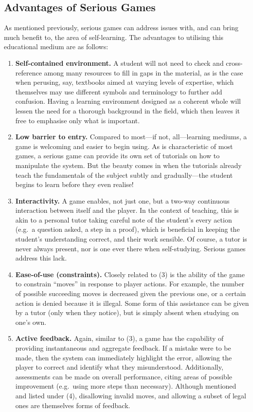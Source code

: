 \documentclass[a4paper]{article}
\begin{document}
\subsection{Advantages of Serious Games}
As mentioned previously, serious games can address issues with, and can bring much benefit to, the area of self-learning. The advantages to utilising this educational medium are as follows:
\begin{enumerate}
  \item \textbf{Self-contained environment.} A student will not need to check and cross-reference among many resources to fill in gaps in the material, as is the case when perusing, say, textbooks aimed at varying levels of expertise, which themselves may use different symbols and terminology to further add confusion. Having a learning environment designed as a coherent whole will lessen the need for a thorough background in the field, which then leaves it free to emphasise only what is important.
  \item \textbf{Low barrier to entry.} Compared to most---if not, all---learning mediums, a game is welcoming and easier to begin using. As is characteristic of most games, a serious game can provide its own set of tutorials on how to manipulate the system. But the beauty comes in when the tutorials already teach the fundamentals of the subject subtly and gradually---the student begins to learn before they even realise!
  \item \textbf{Interactivity.} A game enables, not just one, but a two-way continuous interaction between itself and the player. In the context of teaching, this is akin to a personal tutor taking careful note of the student's every action (e.g.\ a question asked, a step in a proof), which is beneficial in keeping the student's understanding correct, and their work sensible. Of course, a tutor is never always present, nor is one ever there when self-studying. Serious games address this lack.
  \item \textbf{Ease-of-use (constraints).} Closely related to (3) is the ability of the game to constrain ``moves'' in response to player actions. For example, the number of possible succeeding moves is decreased given the previous one, or a certain action is denied because it is illegal. Some form of this assistance can be given by a tutor (only when they notice), but is simply absent when studying on one's own.
  \item \textbf{Active feedback.} Again, similar to (3), a game has the capability of providing instantaneous and aggregate feedback. If a mistake were to be made, then the system can immediately highlight the error, allowing the player to correct and identify what they misunderstood. Additionally, assessments can be made on overall performance, citing areas of possible improvement (e.g.\ using more steps than necessary). Although mentioned and listed under (4), disallowing invalid moves, and allowing a subset of legal ones are themselves forms of feedback.

\end{enumerate}
\end{document}
